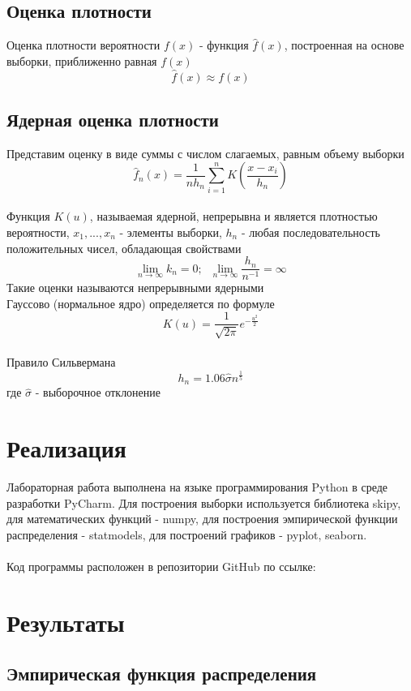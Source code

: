 \documentclass{article}
\begin{document}
\subsection{Оценка плотности}

Оценка плотности вероятности $f(x)$ - функция $\hat{f}(x)$, построенная на основе выборки, приближенно равная $f(x)$
$$
\hat{f}(x) \approx f(x)
$$

\subsection{Ядерная оценка плотности}

Представим оценку в виде суммы с числом слагаемых, равным объему выборки
$$
\hat{f}_n(x) = \frac{1}{nh_n} \sum_{i=1}^n K \left( \frac{x-x_i}{h_n} \right)
$$
\\
Функция $K(u)$, называемая ядерной, непрерывна и является плотностью вероятности, $x_1,...,x_n$ - элементы выборки, ${h_n}$ - любая последовательность положительных чисел, обладающая свойствами 
$$
\lim_{n \to \infty} k_n = 0; \; \; \lim_{{n \to \infty}}\frac{h_n}{n^{-1}} = \infty
$$
Такие оценки называются непрерывными ядерными
\\
Гауссово (нормальное ядро) определяется по формуле
$$
K(u) = \frac{1}{\sqrt{2\pi}}e^{-\frac{u^2}{2}}
$$
\\
Правило Сильвермана 
$$
h_n = 1.06 \hat{\sigma} n^{\frac{1}{5}}
$$
где $\hat{\sigma}$ - выборочное отклонение

\newpage
\section{Реализация}

Лабораторная работа выполнена на языке программирования Python в среде разработки PyCharm. Для построения выборки используется библиотека skipy, для математических функций - numpy, для построения эмпирической функции распределения - statmodels, для построений графиков - pyplot, seaborn.
\\
\\
Код программы расположен в репозитории GitHub по ссылке: \url{}

\newpage
\section{Результаты}

\subsection{Эмпирическая функция распределения}
\end{document}
